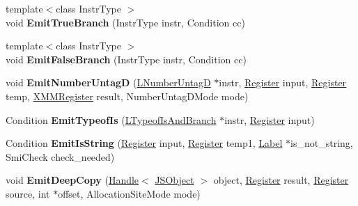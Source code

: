 \begin{DoxyCompactItemize}
\item 
{\footnotesize template$<$class Instr\+Type $>$ }\\void {\bfseries Emit\+True\+Branch} (Instr\+Type instr, Condition cc)\hypertarget{classv8_1_1internal_1_1_l_code_gen_af0b023b0c5bfdac97e10cf47560adf62}{}\label{classv8_1_1internal_1_1_l_code_gen_af0b023b0c5bfdac97e10cf47560adf62}

\item 
{\footnotesize template$<$class Instr\+Type $>$ }\\void {\bfseries Emit\+False\+Branch} (Instr\+Type instr, Condition cc)\hypertarget{classv8_1_1internal_1_1_l_code_gen_a24f4472aa51899a74a69b6280585d3b6}{}\label{classv8_1_1internal_1_1_l_code_gen_a24f4472aa51899a74a69b6280585d3b6}

\item 
void {\bfseries Emit\+Number\+UntagD} (\hyperlink{classv8_1_1internal_1_1_l_number_untag_d}{L\+Number\+UntagD} $\ast$instr, \hyperlink{structv8_1_1internal_1_1_register}{Register} input, \hyperlink{structv8_1_1internal_1_1_register}{Register} temp, \hyperlink{structv8_1_1internal_1_1_double_register}{X\+M\+M\+Register} result, Number\+Untag\+D\+Mode mode)\hypertarget{classv8_1_1internal_1_1_l_code_gen_a5fa80bef9b9694f2c9441c7aca37c1eb}{}\label{classv8_1_1internal_1_1_l_code_gen_a5fa80bef9b9694f2c9441c7aca37c1eb}

\item 
Condition {\bfseries Emit\+Typeof\+Is} (\hyperlink{classv8_1_1internal_1_1_l_typeof_is_and_branch}{L\+Typeof\+Is\+And\+Branch} $\ast$instr, \hyperlink{structv8_1_1internal_1_1_register}{Register} input)\hypertarget{classv8_1_1internal_1_1_l_code_gen_a06f252ea52c3c12e6489c065c4304795}{}\label{classv8_1_1internal_1_1_l_code_gen_a06f252ea52c3c12e6489c065c4304795}

\item 
Condition {\bfseries Emit\+Is\+String} (\hyperlink{structv8_1_1internal_1_1_register}{Register} input, \hyperlink{structv8_1_1internal_1_1_register}{Register} temp1, \hyperlink{classv8_1_1internal_1_1_label}{Label} $\ast$is\+\_\+not\+\_\+string, Smi\+Check check\+\_\+needed)\hypertarget{classv8_1_1internal_1_1_l_code_gen_a23c72e27a6bf50a391c940939754673d}{}\label{classv8_1_1internal_1_1_l_code_gen_a23c72e27a6bf50a391c940939754673d}

\item 
void {\bfseries Emit\+Deep\+Copy} (\hyperlink{classv8_1_1internal_1_1_handle}{Handle}$<$ \hyperlink{classv8_1_1internal_1_1_j_s_object}{J\+S\+Object} $>$ object, \hyperlink{structv8_1_1internal_1_1_register}{Register} result, \hyperlink{structv8_1_1internal_1_1_register}{Register} source, int $\ast$offset, Allocation\+Site\+Mode mode)\hypertarget{classv8_1_1internal_1_1_l_code_gen_a1a84a4d1ebc9ba8736407dd2a6d1214a}{}\label{classv8_1_1internal_1_1_l_code_gen_a1a84a4d1ebc9ba8736407dd2a6d1214a}


\end{DoxyCompactItemize}
